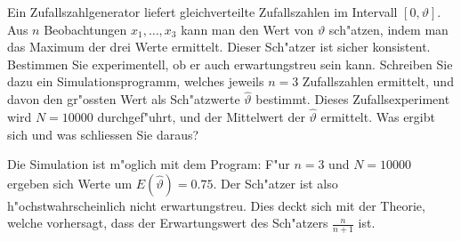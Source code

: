 Ein Zufallszahlgenerator liefert gleichverteilte Zufallszahlen im
Intervall $[0,\vartheta]$. Aus $n$ Beobachtungen $x_1,\dots,x_3$ kann
man den Wert von $\vartheta$ sch"atzen, indem man das Maximum der
drei Werte ermittelt. Dieser Sch"atzer ist sicher konsistent.
Bestimmen Sie experimentell, ob er auch erwartungstreu sein kann.
Schreiben Sie dazu ein Simulationsprogramm, welches jeweils $n=3$
Zufallszahlen ermittelt, und davon den gr"ossten Wert als
Sch"atzwerte $\hat\vartheta$ bestimmt.
Dieses Zufallsexperiment wird $N=10000$ durchgef"uhrt, und der Mittelwert
der $\hat\vartheta$ ermittelt. Was ergibt sich und was schliessen Sie
daraus?

\begin{loesung}
Die Simulation ist m"oglich mit dem Program:
{\small
{}
}
F"ur $n=3$ und $N=10000$ ergeben sich Werte  um $E(\hat\vartheta)=0.75$.
Der Sch"atzer ist also h"ochstwahrscheinlich nicht erwartungstreu.
Dies deckt sich mit der Theorie, welche vorhersagt, dass der Erwartungswert
des Sch"atzers $\frac{n}{n+1}$ ist.
\end{loesung}

